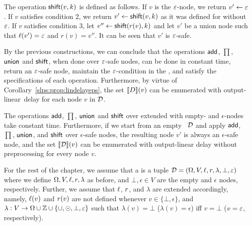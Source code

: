 	The operation $\mathsf{shift}( v, k)$ is defined as follows. If $v$ is the $\varepsilon$-node, we return $v'\gets\varepsilon$. If $v$ satisfies condition 2, we return $v'\gets\mathsf{shift}( v, k)$ as it was defined for \dsabbrs without $\varepsilon$. If $v$ satisfies condition 3, let $v''\gets\mathsf{shift}(r(v), k)$ and let $v'$ be a union node such that $\ell(v') =\varepsilon$ and $r(v) = v''$. It can be seen that $v'$ is $\varepsilon$-safe.
	
	By the previous constructions, we can conclude that the operations $\mathsf{add}$, $\prod$, $\mathsf{union}$ and $\mathsf{shift}$, when done over $\varepsilon$-safe nodes, can be done in constant time, return an $\varepsilon$-safe node, maintain the $\varepsilon$-condition in the \dsabbr, and satisfy the specifications of each operation. Furthermore, by virtue of Corollary~\ref{slps:prop:lindelayeps}, the set ${\llbracket{D}\rrbracket}(v)$ can be enumerated with output-linear~delay for each node $v$ in $\mathcal{D}$.


\begin{theorem}\label{slps:theo:data-structure-eps}
	The operations $\mathsf{add}$, $\prod$, $\mathsf{union}$ and $\mathsf{shift}$ over \dsabbr{} extended with empty- and $\epsilon$-nodes take constant time. Furthermore, if we start from an empty \dsabbr{}~$\mathcal{D}$ and apply $\mathsf{add}$, $\prod$, $\mathsf{union}$, and $\mathsf{shift}$ over $\epsilon$-safe nodes, the resulting node $v'$ is always an $\epsilon$-safe node, and the set ${\llbracket{\mathcal{D}}\rrbracket}(v)$ can be enumerated with output-linear delay without preprocessing for every node $v$.
\end{theorem} 

For the rest of the chapter, we assume that a \dsabbr{} is a tuple $\mathcal{D} = (\Omega, V, \ell, r, \lambda, \bot, \varepsilon)$ where we define $\Omega, V, \ell, r,\lambda$ as before, and $\bot, \epsilon \in V$ are the empty and $\epsilon$ nodes, respectively. Further, we assume that $\ell$, $r$, and $\lambda$ are extended accordingly, namely,  $\ell(v)$ and $r(v)$ are not defined whenever $v \in \{\bot, \epsilon\}$, and $\lambda:V\to\Omega\cup\mathbb{Z} \cup \{\cup, \odot,\bot, \varepsilon\}$ such that $\lambda(v) = \bot$ ($\lambda(v) = \epsilon$) iff $v = \bot$ ($v = \varepsilon$, respectively). 




